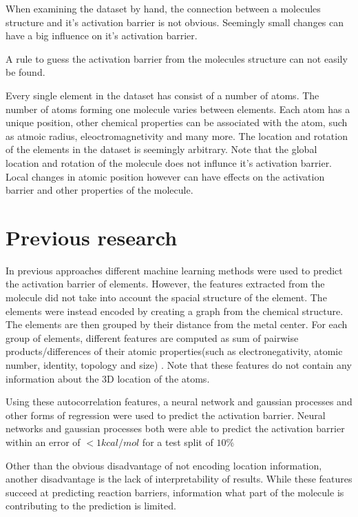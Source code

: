 When examining the dataset by hand, the connection between a molecules structure and it's activation barrier is not obvious.
Seemingly small changes can have a big influence on it's activation barrier.

A rule to guess the activation barrier from the molecules structure can not easily be found.

Every single element in the dataset has consist of a number of atoms.
The number of atoms forming one molecule varies between elements.
Each atom has a unique position, other chemical properties can be associated with the atom, such as atmoic radius, eleoctromagnetivity and many more.
The location and rotation of the elements in the dataset is seemingly arbitrary.
Note that the global location and rotation of the molecule does not influnce it's activation barrier.
Local changes in atomic position however can have effects on the activation barrier and other properties of the molecule.
  

\section{Previous research}

In previous approaches different machine learning methods were used to predict the activation barrier of elements.
However, the features extracted from the molecule did not take into account the spacial structure of the element.
The elements were instead encoded by creating a graph from the chemical structure.
The elements are then grouped by their distance from the metal center.
For each group of elements, different features are computed as sum of pairwise products/differences of their atomic properties(such as electronegativity, atomic number, identity, topology and size) \cite{friederich_dos}.
Note that these features do not contain any information about the 3D location of the atoms.

Using these autocorrelation features, a neural network and gaussian processes and other forms of regression were used to predict the activation barrier.
Neural networks and gaussian processes both were able to predict the activation barrier within an error of $<1 kcal/mol$ for a test split of $10\%$

Other than the obvious disadvantage of not encoding location information, another disadvantage is the lack of interpretability of results.
While these features succeed at predicting reaction barriers, information what part of the molecule is contributing to the prediction is limited.

